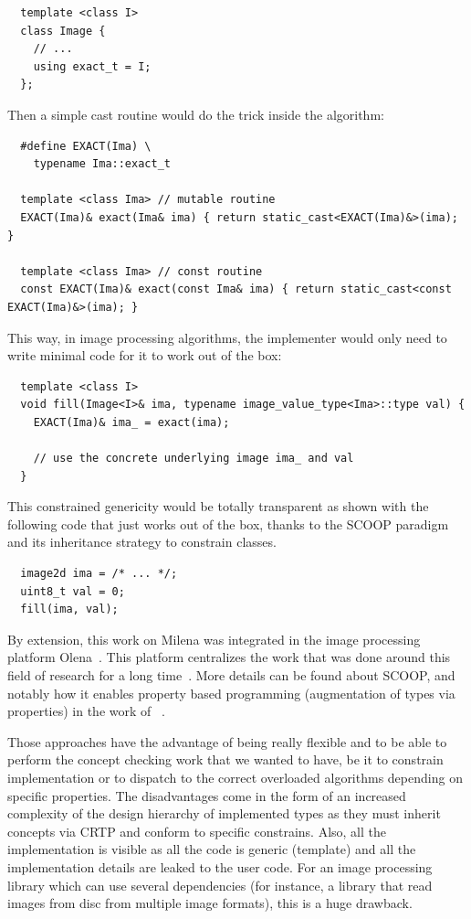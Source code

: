 \begin{verbatim}
  template <class I>
  class Image {
    // ...
    using exact_t = I;
  };
\end{verbatim}

Then a simple cast routine would do the trick inside the algorithm:

\begin{verbatim}
  #define EXACT(Ima) \
    typename Ima::exact_t

  template <class Ima> // mutable routine
  EXACT(Ima)& exact(Ima& ima) { return static_cast<EXACT(Ima)&>(ima); }

  template <class Ima> // const routine
  const EXACT(Ima)& exact(const Ima& ima) { return static_cast<const EXACT(Ima)&>(ima); }
\end{verbatim}

This way, in image processing algorithms, the implementer would only need to write minimal code for it to work out of
the box:

\begin{verbatim}
  template <class I>
  void fill(Image<I>& ima, typename image_value_type<Ima>::type val) {
    EXACT(Ima)& ima_ = exact(ima);

    // use the concrete underlying image ima_ and val
  }
\end{verbatim}

This constrained genericity would be totally transparent as shown with the following code that just works out of the
box, thanks to the SCOOP paradigm and its inheritance strategy to constrain classes.
\begin{verbatim}
  image2d ima = /* ... */;
  uint8_t val = 0;
  fill(ima, val);
\end{verbatim}

By extension, this work on Milena was integrated in the image processing platform
Olena~\parencite{olena.2000.www,geraud.2012.hdr}. This platform centralizes the work that was done around this field of
research for a long time~\parencite{geraud.2000.icpr,duretlutz.2000.olena,darbon.2002.ismm,darbon.2004.ecoopphd}. More
details can be found about SCOOP, and notably how it enables property based programming (augmentation of types via
properties) in the work of
\citeauthor{levillain.2011.phd}~\parencite{levillain.2011.phd,levillain.2009.ismm,levillain.2010.icip,levillain.2010.wadgmm,levillain.2011.gretsi,levillain.2011.phd,levillain.2012.wadgmm-lncs,levillain.2014.ciarp}.

Those approaches have the advantage of being really flexible and to be able to perform the concept checking work that we
wanted to have, be it to constrain implementation or to dispatch to the correct overloaded algorithms depending on
specific properties. The disadvantages come in the form of an increased complexity of the design hierarchy of
implemented types as they must inherit concepts via CRTP and conform to specific constrains. Also, all the
implementation is visible as all the code is generic (template) and all the implementation details are leaked to the
user code. For an image processing library which can use several dependencies (for instance, a library that read images
from disc from multiple image formats), this is a huge drawback.

